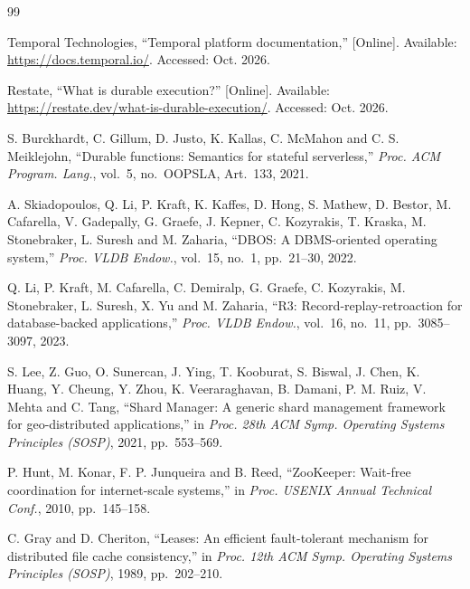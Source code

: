 \clearpage{}
{}
\begin{singlespace}
\small
\begin{thebibliography}{99}

Temporal Technologies, ``Temporal platform documentation,'' [Online].
Available: \url{https://docs.temporal.io/}. Accessed: Oct. 2026.

Restate, ``What is durable execution?'' [Online]. Available:
\url{https://restate.dev/what-is-durable-execution/}. Accessed: Oct. 2026.

S. Burckhardt, C. Gillum, D. Justo, K. Kallas, C. McMahon and
C. S. Meiklejohn, ``Durable functions: Semantics for stateful serverless,''
\emph{Proc. ACM Program. Lang.}, vol.~5, no.~OOPSLA, Art.~133, 2021.

A. Skiadopoulos, Q. Li, P. Kraft, K. Kaffes, D. Hong, S. Mathew, D. Bestor,
M. Cafarella, V. Gadepally, G. Graefe, J. Kepner, C. Kozyrakis, T. Kraska,
M. Stonebraker, L. Suresh and M. Zaharia, ``DBOS: A DBMS-oriented operating
system,'' \emph{Proc. VLDB Endow.}, vol.~15, no.~1, pp.~21--30, 2022.

Q. Li, P. Kraft, M. Cafarella, C. Demiralp, G. Graefe, C. Kozyrakis,
M. Stonebraker, L. Suresh, X. Yu and M. Zaharia, ``R3: Record-replay-retroaction
for database-backed applications,'' \emph{Proc. VLDB Endow.}, vol.~16, no.~11,
pp.~3085--3097, 2023.

S. Lee, Z. Guo, O. Sunercan, J. Ying, T. Kooburat, S. Biswal, J. Chen,
K. Huang, Y. Cheung, Y. Zhou, K. Veeraraghavan, B. Damani, P. M. Ruiz,
V. Mehta and C. Tang, ``Shard Manager: A generic shard management framework
for geo-distributed applications,'' in \emph{Proc. 28th ACM Symp. Operating
Systems Principles (SOSP)}, 2021, pp.~553--569.

P. Hunt, M. Konar, F. P. Junqueira and B. Reed, ``ZooKeeper: Wait-free
coordination for internet-scale systems,'' in \emph{Proc. USENIX Annual
Technical Conf.}, 2010, pp.~145--158.

C. Gray and D. Cheriton, ``Leases: An efficient fault-tolerant mechanism for
distributed file cache consistency,'' in \emph{Proc. 12th ACM Symp. Operating
Systems Principles (SOSP)}, 1989, pp.~202--210.


\end{thebibliography}
\end{singlespace}
